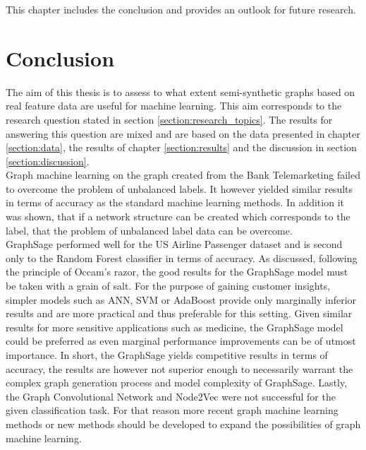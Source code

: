 
  This chapter includes the conclusion and provides an outlook for future
  research.

  \section{Conclusion}
  \label{section:conclusion}

  The aim of this thesis is to assess to what extent semi-synthetic graphs based 
  on real feature data are useful for machine learning. This aim corresponds to
  the research question stated in section \ref{section:research_topics}. The
  results for answering this question are mixed and are based on the data
  presented in chapter \ref{section:data}, the results of chapter
  \ref{section:results} and the discussion in section \ref{section:discussion}.
  \\

  \noindent Graph machine learning on the graph created from the Bank 
  Telemarketing failed to overcome the problem of unbalanced labels. It however 
  yielded similar results in terms of accuracy as the standard machine learning 
  methods. In addition it was shown, that if a network structure can be created 
  which corresponds to the label, that the problem of unbalanced label data can 
  be overcome. \\

  \noindent GraphSage performed well for the US Airline Passenger dataset and
  is second only to the Random Forest classifier in terms of accuracy. As
  discussed, following the principle of Occam's razor, the good results for the
  GraphSage model must be taken with a grain of salt. For the purpose of
  gaining customer insights, simpler models such as ANN, SVM or AdaBoost provide
  only marginally inferior results and are more practical and thus preferable
  for this setting. Given similar results for more sensitive applications such
  as medicine, the GraphSage model could be preferred as even marginal
  performance improvements can be of utmost importance. In short, the GraphSage
  yields competitive results in terms of accuracy, the results are however not
  superior enough to necessarily warrant the complex graph generation process
  and model complexity of GraphSage. Lastly, the Graph Convolutional Network and
  Node2Vec were not successful for the given classification task. For that
  reason more recent graph machine learning methods or new methods should be
  developed to expand the possibilities of graph machine learning.\\

